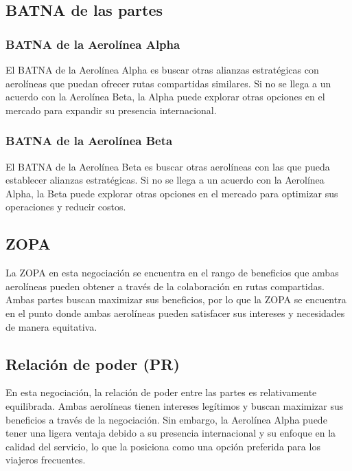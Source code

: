 \subsection{BATNA de las partes}
\subsubsection{BATNA de la Aerolínea Alpha}
El BATNA de la Aerolínea Alpha es buscar otras alianzas estratégicas con aerolíneas que puedan ofrecer rutas compartidas similares. Si no se llega a un acuerdo con la Aerolínea Beta, la Alpha puede explorar otras opciones en el mercado para expandir su presencia internacional.
\subsubsection{BATNA de la Aerolínea Beta}
El BATNA de la Aerolínea Beta es buscar otras aerolíneas con las que pueda establecer alianzas estratégicas. Si no se llega a un acuerdo con la Aerolínea Alpha, la Beta puede explorar otras opciones en el mercado para optimizar sus operaciones y reducir costos. 
\subsection{ZOPA}
La ZOPA en esta negociación se encuentra en el rango de beneficios que ambas aerolíneas pueden obtener a través de la colaboración en rutas compartidas. Ambas partes buscan maximizar sus beneficios, por lo que la ZOPA se encuentra en el punto donde ambas aerolíneas pueden satisfacer sus intereses y necesidades de manera equitativa.
\subsection{Relación de poder (PR)}
En esta negociación, la relación de poder entre las partes es relativamente equilibrada. Ambas aerolíneas tienen intereses legítimos y buscan maximizar sus beneficios a través de la negociación. Sin embargo, la Aerolínea Alpha puede tener una ligera ventaja debido a su presencia internacional y su enfoque en la calidad del servicio, lo que la posiciona como una opción preferida para los viajeros frecuentes.

